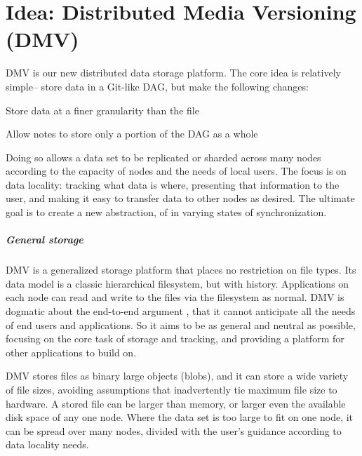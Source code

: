 \chapter{Idea: Distributed Media Versioning (DMV)}


\gls{DMV} is our new distributed data storage platform. The core idea is
relatively simple-- store data in a Git-like \gls{DAG}, but make the following
changes:

\begin{tight_enumerate}

    \item{Store data at a finer granularity than the file}

    \item{Allow notes to store only a portion of the \gls{DAG} as a whole}

\end{tight_enumerate}

Doing so allows a data set to be replicated or sharded across many nodes
according to the capacity of nodes and the needs of local users. The focus is on
data locality: tracking what data is where, presenting that information to the
user, and making it easy to transfer data to other nodes as desired. The
ultimate goal is to create a new abstraction, of  in varying states of synchronization.


\paragraph{General storage}

\gls{DMV} is a generalized storage platform that places no restriction on file
types. Its data model is a classic hierarchical filesystem, but with history.
Applications on each node can read and write to the files via the filesystem as
normal. \gls{DMV} is dogmatic about the end-to-end argument
\cite{endtoendargument}, that it cannot anticipate all the needs of end users
and applications. So it aims to be as general and neutral as possible, focusing
on the core task of storage and tracking, and providing a platform for other
applications to build on.

\gls{DMV} stores files as binary large objects (\glspl{blob}), and it can store
a wide variety of file sizes, avoiding assumptions that inadvertently tie
maximum file size to hardware. A stored file can be larger than memory, or
larger even the available disk space of any one node. Where the data set is too
large to fit on one node, it can be spread over many nodes, divided with the
user's guidance according to data locality needs.

